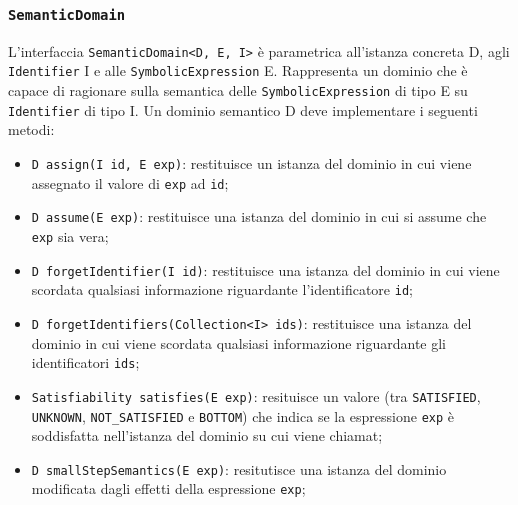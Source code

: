 \subsubsection{\texttt{SemanticDomain}}\label{subsec:semanticDomain}
L'interfaccia \texttt{SemanticDomain<D, E, I>} è parametrica all'istanza concreta D, agli \texttt{Identifier} I e alle \texttt{SymbolicExpression} E. Rappresenta un dominio che è capace di ragionare sulla semantica delle \texttt{SymbolicExpression} di tipo E su \texttt{Identifier} di tipo I. Un dominio semantico D deve implementare i seguenti metodi:
\begin{itemize}
\setlength\itemsep{0.1em}
    \item \texttt{D assign(I id, E exp)}: restituisce un istanza del dominio in cui viene assegnato il valore di \texttt{exp} ad \texttt{id};
    \item \texttt{D assume(E exp)}: restituisce una istanza del dominio in cui si assume che \texttt{exp} sia vera;
    \item \texttt{D forgetIdentifier(I id)}: restituisce una istanza del dominio in cui viene scordata qualsiasi informazione riguardante l'identificatore \texttt{id};
    \item \texttt{D forgetIdentifiers(Collection<I> ids)}: restituisce una istanza del dominio in cui viene scordata qualsiasi informazione riguardante gli identificatori \texttt{ids};
    \item \texttt{Satisfiability satisfies(E exp)}: resituisce un valore (tra \texttt{SATISFIED}, \texttt{UNKNOWN}, \texttt{NOT\_SATISFIED} e \texttt{BOTTOM}) che indica se la espressione \texttt{exp} è soddisfatta nell'istanza del dominio su cui viene chiamat;
    \item \texttt{D smallStepSemantics(E exp)}: resitutisce una istanza del dominio modificata dagli effetti della espressione \texttt{exp};
\end{itemize}

